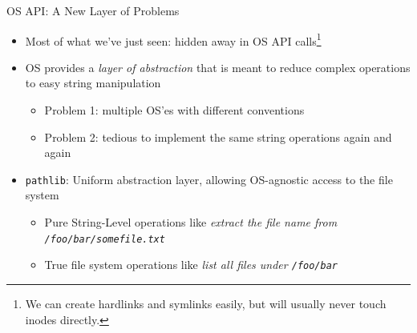 
\begin{frame}{OS API: A New Layer of Problems}
%
\begin{itemize}
\item Most of what we've just seen: hidden away in OS API calls\footnote{We can create hardlinks and symlinks easily, but will usually never touch inodes directly.}
\item OS provides a \emph{layer of abstraction} that is meant to reduce complex operations to easy string manipulation
	\begin{itemize}
	\item Problem 1: multiple OS'es with different conventions
	\item Problem 2: tedious to implement the same string operations again and again
	\end{itemize}
\item[\Thus] \texttt{pathlib}: Uniform abstraction layer, allowing OS-agnostic access to the file system
	\begin{itemize}
	\item Pure String-Level operations like \emph{extract the file name from \texttt{/foo/bar/somefile.txt}}
	\item True file system operations like \emph{list all files under \texttt{/foo/bar}}
	\end{itemize}
\end{itemize}
%
\end{frame}



